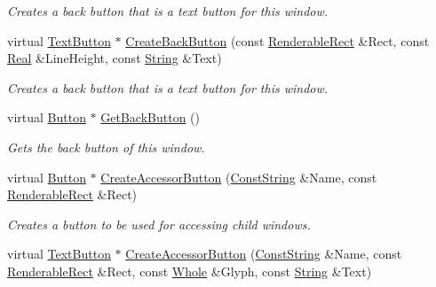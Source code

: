 \begin{DoxyCompactItemize}
\begin{DoxyCompactList}\small\item\em Creates a back button that is a text button for this window. \item\end{DoxyCompactList}\item 
virtual \hyperlink{classphys_1_1UI_1_1TextButton}{TextButton} $\ast$ \hyperlink{classphys_1_1UI_1_1MenuWindow_a414693da51ed5cf46999c6c16c01ccd1}{CreateBackButton} (const \hyperlink{structphys_1_1UI_1_1RenderableRect}{RenderableRect} \&Rect, const \hyperlink{namespacephys_af7eb897198d265b8e868f45240230d5f}{Real} \&LineHeight, const \hyperlink{namespacephys_aa03900411993de7fbfec4789bc1d392e}{String} \&Text)
\begin{DoxyCompactList}\small\item\em Creates a back button that is a text button for this window. \item\end{DoxyCompactList}\item 
virtual \hyperlink{classphys_1_1UI_1_1Button}{Button} $\ast$ \hyperlink{classphys_1_1UI_1_1MenuWindow_a7c286758bac0e21154f41a56d9da8c08}{GetBackButton} ()
\begin{DoxyCompactList}\small\item\em Gets the back button of this window. \item\end{DoxyCompactList}\item 
virtual \hyperlink{classphys_1_1UI_1_1Button}{Button} $\ast$ \hyperlink{classphys_1_1UI_1_1MenuWindow_a20dc3081047b3fb88a47d730f5da084a}{CreateAccessorButton} (\hyperlink{namespacephys_a5ce5049f8b4bf88d6413c47b504ebb31}{ConstString} \&Name, const \hyperlink{structphys_1_1UI_1_1RenderableRect}{RenderableRect} \&Rect)
\begin{DoxyCompactList}\small\item\em Creates a button to be used for accessing child windows. \item\end{DoxyCompactList}\item 
virtual \hyperlink{classphys_1_1UI_1_1TextButton}{TextButton} $\ast$ \hyperlink{classphys_1_1UI_1_1MenuWindow_a6af950740ba52d93e293d8958ab5f1e4}{CreateAccessorButton} (\hyperlink{namespacephys_a5ce5049f8b4bf88d6413c47b504ebb31}{ConstString} \&Name, const \hyperlink{structphys_1_1UI_1_1RenderableRect}{RenderableRect} \&Rect, const \hyperlink{namespacephys_a460f6bc24c8dd347b05e0366ae34f34a}{Whole} \&Glyph, const \hyperlink{namespacephys_aa03900411993de7fbfec4789bc1d392e}{String} \&Text)

\end{DoxyCompactItemize}
